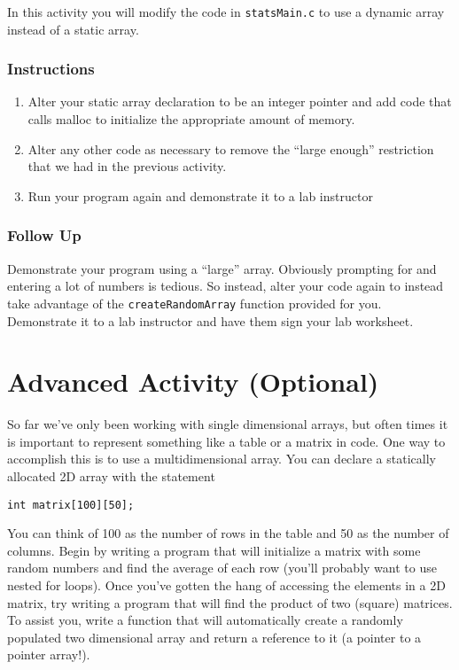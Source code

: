 \documentclass[12pt]{scrartcl}
\begin{document}
In this activity you will modify the code in \texttt{statsMain.c} to 
use a dynamic array instead of a static array.

\subsubsection*{Instructions}

\begin{enumerate}
  \item Alter your static array declaration to be an integer pointer and add 
	code that calls malloc to initialize the appropriate amount of memory.
  \item Alter any other code as necessary to remove the ``large enough'' 
	restriction that we had in the previous activity.
  \item Run your program again and demonstrate it to a lab instructor
\end{enumerate}
	
\subsubsection*{Follow Up}

Demonstrate your program using a ``large'' array.  Obviously prompting 
for and entering a lot of numbers is tedious.  So instead, alter your code 
again to instead take advantage of the \texttt{createRandomArray} 
function provided for you.  Demonstrate it to a lab instructor and have 
them sign your lab worksheet. 

\section{Advanced Activity (Optional)}

So far we've only been working with single dimensional arrays, but often 
times it is important to represent something like a table or a matrix in 
code.  One way to accomplish this is to use a multidimensional array.  
You can declare a statically allocated 2D array with the statement 

\texttt{int matrix[100][50];}

You can think of 100 as the number of rows in the table and 50 as the 
number of columns.  Begin by writing a program that will initialize a 
matrix with some random numbers and find the average of each row 
(you'll probably want to use nested for loops).  Once you've gotten 
the hang of accessing the elements in a 2D matrix, try writing a 
program that will find the product of two (square) matrices.  To assist 
you, write a function that will automatically create a randomly 
populated two dimensional array and return a reference to it (a 
pointer to a pointer array!).
\end{document}
